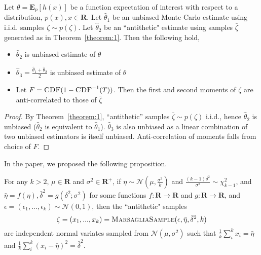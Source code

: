 \begin{corollary}
Let $\theta = \mathbf{E}_p[h(x)]$ be a function  expectation of interest with respect to a distribution, $p(x), x \in \mathbf{R}$. Let $\hat{\theta}_1$ be an unbiased Monte Carlo estimate using i.i.d. samples $\zeta \sim p(\zeta)$. Let $\hat{\theta}_2$ be an ``antithetic" estimate using samples $\bar{\zeta}$ generated as in Theorem~\ref{theorem:1}. Then the following hold,

\begin{itemize}
    \item $\hat{\theta}_2$ is unbiased estimate of $\theta$
    \item $\hat{\theta}_3 = \frac{\hat{\theta}_1 + \hat{\theta}_2}{2}$  is unbiased estimate of $\theta$
    \item Let $F = \textsc{CDF}(1 - \textsc{CDF}^{-1}(T))$. Then the first and second moments of $\zeta$ are anti-correlated to those of $\bar{\zeta}$
\end{itemize}
\label{corollary:1}
\end{corollary}

\begin{proof}
By Theorem~\ref{theorem:1}, ``antithetic'' samples $\bar{\zeta} \sim p(\zeta)$ i.i.d., hence $\hat{\theta}_2$ is unbiased ($\hat{\theta}_2$ is equivalent to  $\hat{\theta}_1$). $\hat{\theta}_3$ is also  unbiased as a linear combination of two unbiased estimators is itself unbiased. Anti-correlation of moments falls from choice of $F$.
\end{proof}

In the paper, we proposed the following proposition.

\begin{prop}
For any $k > 2$, $\mu \in \mathbf{R}$ and $\sigma^2 \in \mathbf{R}^{+}$, if $\eta \sim \mathcal{N}(\mu, \frac{\sigma^2}{k})$ and $\frac{(k-1)\delta^2}{\sigma^2} \sim \chi^2_{k-1}$, and $\bar{\eta} = f(\eta), \bar{\delta}^2 = g(\delta^2; \sigma^2)$ for some functions $f: \mathbf{R} \rightarrow \mathbf{R}$ and $g: \mathbf{R} \rightarrow \mathbf{R}$, and $\epsilon = (\epsilon_1, ..., \epsilon_k) \sim \mathcal{N}(0, 1)$, then the ``antithetic" samples \[\zeta = (x_1, ..., x_k) = \textsc{MarsagliaSample}(\epsilon, \bar{\eta}, \bar{\delta}^2, k)\] are independent normal variates sampled from $\mathcal{N}(\mu, \sigma^2)$ such that $\frac{1}{k}\sum_i^k x_i = \bar{\eta}$ and $\frac{1}{k}\sum_i^k (x_i - \bar{\eta})^2 = \bar{\delta}^2$.
\label{prop:3}
\end{prop}

